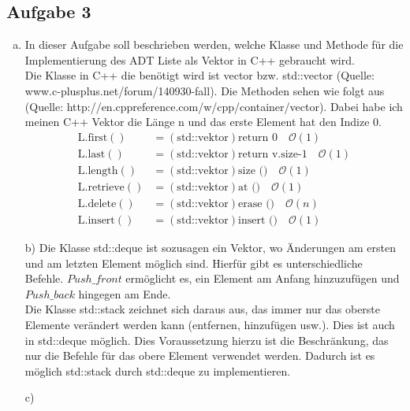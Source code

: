 \documentclass[11pt]{article}
\begin{document}
\subsection*{Aufgabe 3}
\begin{enumerate}[a)]
	\item 
	In dieser Aufgabe soll beschrieben werden, welche Klasse und Methode für die Implementierung des ADT Liste als Vektor in C++ gebraucht wird.\\
	Die Klasse in C++ die benötigt wird ist vector bzw. std::vector (Quelle: www.c-plusplus.net/forum/140930-fall). Die Methoden sehen wie folgt aus (Quelle: http://en.cppreference.com/w/cpp/container/vector). Dabei habe ich meinen C++ Vektor die Länge n und das erste Element hat den Indize 0.
	\begin{align}
	\text{L.first}() &= (\text{std::vektor}) \text{return 0}\quad \mathcal{O}(1)\\
	\text{L.last}() &= (\text{std::vektor}) \text{return v.size-1}\quad \mathcal{O}(1)\\
	\text{L.length}() &= (\text{std::vektor}) \text{size ()}\quad \mathcal{O}(1)\\
	\text{L.retrieve}() &= (\text{std::vektor}) \text{at ()}\quad \mathcal{O}(1)\\
	\text{L.delete}() &= (\text{std::vektor}) \text{erase ()}\quad \mathcal{O}(n)\\
	\text{L.insert}() &= (\text{std::vektor}) \text{insert ()}\quad \mathcal{O}(1)
	\end{align}
	
	\item[b)]
	Die Klasse std::deque ist sozusagen ein Vektor, wo Änderungen am ersten und am letzten Element möglich sind. Hierfür gibt es unterschiedliche Befehle. $Push\_front$ ermöglicht es, ein Element am Anfang hinzuzufügen und $Push\_back$ hingegen am Ende.\\
	Die Klasse std::stack zeichnet sich daraus aus, das immer nur das oberste Elemente verändert werden kann (entfernen, hinzufügen usw.). Dies ist auch in std::deque möglich. Dies Voraussetzung hierzu ist die Beschränkung, das nur die Befehle für das obere Element verwendet werden. Dadurch ist es möglich std::stack durch std::deque zu implementieren.
	
	\item[c)]
	
	
\end{enumerate}
\end{document}
